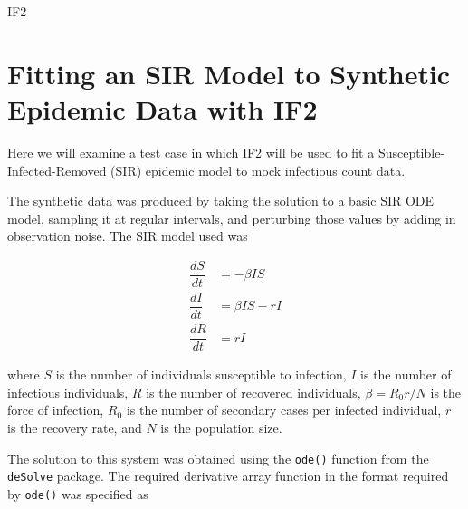 \begin{algorithm}[H]
{{	        }

	        \BlankLine


	    }

        \BlankLine


        \BlankLine

        \caption{IF2}\label{if2}

    \end{algorithm}


\section{Fitting an SIR Model to Synthetic Epidemic Data with IF2}

    Here we will examine a test case in which IF2 will be used to fit a Susceptible-Infected-Removed (SIR) epidemic model to mock infectious count data.

    The synthetic data was produced by taking the solution to a basic SIR ODE model, sampling it at regular intervals, and perturbing those values by adding in observation noise. The SIR model used was

    \begin{equation}
        \begin{array}{rl}
            \dfrac{dS}{dt} & = - \beta I S \\
            \dfrac{dI}{dt} & = \beta I S - rI  \\
            \dfrac{dR}{dt} & = rI
        \end{array}
    \end{equation}

    where $S$ is the number of individuals susceptible to infection, $I$ is the number of infectious individuals, $R$ is the number of recovered individuals, $\beta = R_0 r / N$ is the force of infection, $R_0$ is the number of secondary cases per infected individual, $r$ is the recovery rate, and $N$ is the population size.

    The solution to this system was obtained using the \verb|ode()| function from the \verb|deSolve| package. The required derivative array function in the format required by \verb|ode()| was specified as

